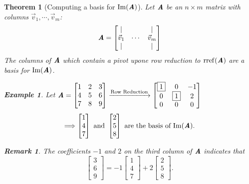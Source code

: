 \documentclass[12pt, a4paper]{article}
\newtheorem{thm}{Theorem}[subsection]
\newtheorem{eg}{Example}[subsection]
\newtheorem*{rmk}{\indent Remark}
\def\IM{{\mathrm{Im}}}
\def\rref{\mathrm{rref}}
\def\vecv{\vec{v}}
\def\matrixA{\textbf{\emph{A}}}
\begin{document}
\begin{thm}[Computing a basis for $\IM(\matrixA)$]
	Let $\matrixA$ be an $n\times m$ matrix with columns $\vecv_1,\cdots,\vecv_m$: \[\matrixA=\begin{bmatrix}|&&|\\\vecv_1&\cdots&\vecv_m\\|&&|\end{bmatrix}\] The columns of $\matrixA	$ which contain a pivot upone row reduction to $\rref(\matrixA)$ are a basis for $\IM(\matrixA)$.
	\begin{eg}
		Let $\matrixA=\begin{bmatrix}1&2&3\\4&5&6\\7&8&9\end{bmatrix}\xrightarrow[]{\text{Row Reduction}}\begin{bmatrix}\boxed{1}&0&-1\\0&\boxed{1}&2\\0&0&0\end{bmatrix}$	
		\[\Longrightarrow\begin{bmatrix}1\\4\\7\end{bmatrix}\text{ and }\begin{bmatrix}2\\5\\8\end{bmatrix}\text{ are the basis of }\IM(\matrixA).\]
		\begin{rmk}
			The coefficients $-1$ and $2$ on the third column of $\matrixA$ indicates that \[\begin{bmatrix}3\\6\\9\end{bmatrix}=-1\begin{bmatrix}1\\4\\7\end{bmatrix}+2\begin{bmatrix}2\\5\\8\end{bmatrix}.\]
		\end{rmk}
	\end{eg}
	

\end{thm}
\end{document}
